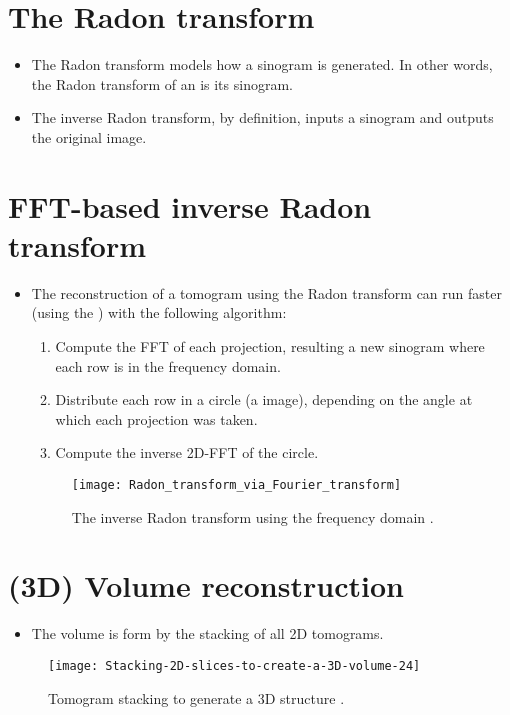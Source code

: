 \section{The Radon transform}
\begin{itemize}
\item The Radon transform models how a sinogram is generated. In other
  words, the Radon transform of an  is
  its sinogram.
\item The inverse Radon transform, by definition, inputs a sinogram
  and outputs the original image.
\end{itemize}

\section{FFT-based inverse Radon transform}
\begin{itemize}
\item The reconstruction of a tomogram using the Radon transform can
  run faster (using the ) with the following algorithm:
  \begin{enumerate}
  \item Compute the FFT of each projection, resulting a new sinogram
    where each row is in the frequency domain.
  \item Distribute each row in a circle (a image), depending on the
    angle at which each projection was taken.
  \item Compute the inverse 2D-FFT of the circle.
  \end{enumerate}
  \begin{figure}[H]
    \vspace{-1ex}
    \centering
    \texttt{[image: Radon\_transform\_via\_Fourier\_transform]}
    \caption{The inverse Radon transform using the frequency domain
      \cite{wikipedia2025radom_transform}.\label{fig:inverse_Radon}}
  \end{figure}
\end{itemize}

\section{(3D) Volume reconstruction}
\begin{itemize}
\item The volume is form by the stacking of all 2D tomograms.
\end{itemize}
\vspace{-1ex}
\begin{figure}[H]
  \centering
  \texttt{[image: Stacking-2D-slices-to-create-a-3D-volume-24]}
  \caption{Tomogram stacking to generate a 3D structure
    \cite{alzu2019multi}.\label{fig:stacking}}
\end{figure}

